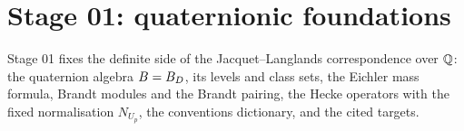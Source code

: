 \section*{Stage 01: quaternionic foundations}\label{sec:stage-01}

Stage 01 fixes the definite side of the Jacquet--Langlands correspondence over $\mathbb{Q}$: the quaternion algebra $B=B_D$,
its levels and class sets, the Eichler mass formula, Brandt modules and the Brandt pairing, the Hecke operators with
the fixed normalisation $N_{U_p}$, the conventions dictionary, and the cited targets.







